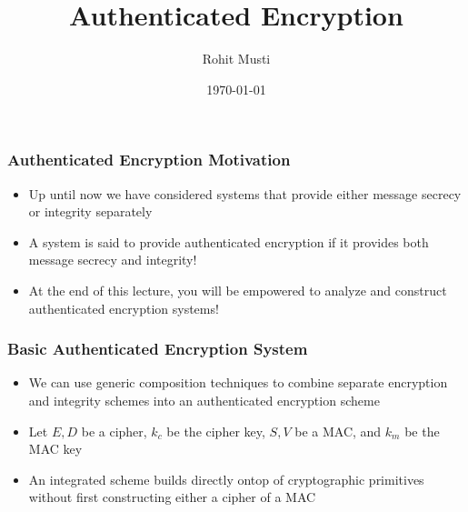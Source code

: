 \documentclass[handout]{beamer}
\title{Authenticated Encryption}
\author{Rohit Musti}
\institute{CUNY - Hunter College}
\date{\today}
\begin{document}
 
\frame{\titlepage}

\begin{frame}
    \frametitle{Authenticated Encryption Motivation}
    \begin{itemize}
      \item \pause Up until now we have considered systems that provide either message secrecy or integrity separately\pause
      \item A system is said to provide authenticated encryption if it provides both message secrecy and integrity! \pause
      \item At the end of this lecture, you will be empowered to analyze and construct authenticated encryption systems!
    \end{itemize}
\end{frame}

\begin{frame}
  \frametitle{Basic Authenticated Encryption System}
  \begin{itemize}
    \item \pause We can use generic composition techniques to combine separate encryption and integrity schemes into an authenticated encryption scheme \pause
    \item Let \(E,D\) be a cipher, \(k_c\) be the cipher key, \(S,V\) be a MAC, and \(k_m\) be the MAC key \pause
    \item An integrated scheme builds directly ontop of cryptographic primitives without first constructing either a cipher of a MAC
  \end{itemize}
\end{frame}
\end{document}
